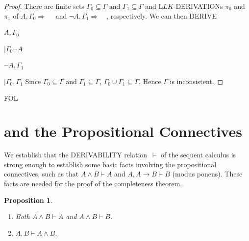 \documentclass[10pt,a4paper]{article}
\newcommand*{\olup}[1]{\MakeUppercase{#1}}
\theoremstyle{plain}
\newtheorem{prop}[thm]{Proposition}
\theoremstyle{definition}
\theoremstyle{remark}
\newenvironment{explain}{}{}
\newcommand*{\olfileid}[3]{}
\newcommand*{\olsection}[1]{\section*{#1}}
\newcommand*{\ollabel}[1]{\label{#1}}
\providecommand{\AxiomC}[1]{}
\providecommand{\RightLabel}[1]{}
\providecommand{\fCenter}{}
\newenvironment{prooftree}{}{}
\providecommand{\lif}{\mathbin{\rightarrow}}
\providecommand{\Sequent}{\mathrel{\Rightarrow}}
\providecommand{\Proves}{\mathrel{\vdash}}
\providecommand{\Log}{\ensuremath{\mathrm{L}}}
\providecommand{\iftag}[1]{#1}
\providecommand{\RightR}[1]{}
\providecommand{\Deduce}{\mathrm{D}}
\providecommand{\UnaryInf}{\ensuremath{\mid}}
\providecommand{\BinaryInf}{\ensuremath{\mid}}
\providecommand{\Cut}{\mathrm{Cut}}
\providecommand{\RightR}{\mathrm{R}}
\providecommand{\iftag}{}
\begin{document}
\begin{proof}
There are finite sets $\Gamma_0 \subseteq \Gamma$ and $\Gamma_1
\subseteq \Gamma$ and $\Log{LK}$-\olup{derivation}s $\pi_0$ and $\pi_1$
of $A, \Gamma_0 \Sequent \quad$ and $\lnot A, \Gamma_1 \Sequent
\quad$, respectively. We can then \olup{derive}
\begin{prooftree}
\AxiomC{}
\RightLabel{$\pi_0$}
\Deduce$ A, \Gamma_0 \fCenter $
\RightLabel{\RightR{\lnot}}
\UnaryInf$ \Gamma_0 \fCenter \lnot A$
\AxiomC{}
\RightLabel{$\pi_1$}
\Deduce$\lnot A, \Gamma_1 \fCenter  $
\RightLabel{\Cut}
\BinaryInf$ \Gamma_0, \Gamma_1 \fCenter $
\end{prooftree}
Since $\Gamma_0 \subseteq \Gamma$ and $\Gamma_1 \subseteq \Gamma$,
$\Gamma_0 \cup \Gamma_1 \subseteq \Gamma$. Hence $\Gamma$ is
inconsistent.
\end{proof}






\iftag{FOL}
      {\olfileid{fol}{seq}{ppr}}
      {\olfileid{pl}{seq}{ppr}}

\olsection{ and the Propositional Connectives}

\begin{explain}
  We establish that the \olup{derivability} relation~$\Proves$ of the
  sequent calculus is strong enough to establish some basic facts
  involving the propositional connectives, such as that $A \land B
  \Proves A$ and $A, A \lif B \Proves B$ (modus ponens). These
  facts are needed for the proof of the completeness theorem.
\end{explain}

\begin{prop}\ollabel{prop:provability-land}
  \begin{enumerate}
  \item \ollabel{prop:provability-land-left} Both $A \land B \Proves
    A$ and $A \land B \Proves B$.
  \item \ollabel{prop:provability-land-right} $A, B \Proves A \land
    B$.
  \end{enumerate}
\end{prop}
\end{document}
